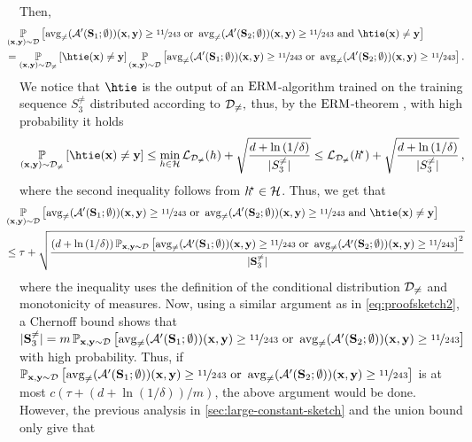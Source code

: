 Then,
\begin{align*}
& \hspace{-0.5 cm} \p_{(\rx,\ry)\sim \cD}\left[ \avg( \cA'(\rS_{1};\emptyset))(\rx,\ry)\geq \nicefrac{11}{243}\text{ or } \avg( \cA'(\rS_{2};\emptyset))(\rx,\ry)\geq \nicefrac{11}{243} \text{ and } \htie(\rx)\not=\ry\right]
    \\
& \hspace{-0.5 cm} = 
    \p_{(\rx,\ry)\sim \cD_{\not=}}\left[ \htie (\rx)\not=\ry\right]
    \p_{(\rx,\ry)\sim \cD}\left[ \avg( \cA'(\rS_{1};\emptyset))(\rx,\ry)\geq \nicefrac{11}{243}\text{ or } \avg( \cA'(\rS_{2};\emptyset))(\rx,\ry)\geq \nicefrac{11}{243}\right].
\end{align*}
We notice that $\htie$ is the output of an $ \mathrm{ERM} $-algorithm trained on the training sequence $ S_{3}^{\not=} $ distributed according to $ \mathcal{D}_{\not=},$ thus, by the $ \mathrm{ERM} $-theorem , with high probability it holds 
\begin{align}
    \p_{(\rx,\ry)\sim \cD_{\not=}}\left[ \htie(\rx)\not=\ry\right]\leq \min_{h\in \cH}\ls_{\cD_{\not=}}(h)+\sqrt{\frac{d+\ln{\left(1/\delta \right)}}{|S_{3}^{\not=}|}}\leq \ls_{\cD_{\not=}}(\hs)+\sqrt{\frac{d+\ln{\left(1/\delta \right)}}{|S_{3}^{\not=}|}} \,,\nonumber
\end{align}
where the second inequality follows from $h^{\negmedspace\star}\in\mathcal{H}$. Thus, we get that
\begin{align*}
&  \hspace{-0.5 cm} \p_{(\rx,\ry)\sim \cD}\left[ \avg( \cA'(\rS_{1};\emptyset))(\rx,\ry)\geq \nicefrac{11}{243}\text{ or } \avg( \cA'(\rS_{2};\emptyset))(\rx,\ry)\geq \nicefrac{11}{243}\text{ and } \htie(\rx)\not=\ry\right] \\
& \hspace{-0.5 cm} \leq \tau+\sqrt{\frac{\left(d+\ln{\left(1/\delta \right)}\right)\p_{\rx,\ry\sim \cD}\left[\avg( \cA'(\rS_{1};\emptyset))(\rx,\ry)\geq \nicefrac{11}{243}\text{ or } \avg( \cA'(\rS_{2};\emptyset))(\rx,\ry)\geq \nicefrac{11}{243}\right]^{2}}{|\rS_{3}^{\not=}|}}
\end{align*}
where the inequality uses the definition of the conditional distribution $ \mathcal{D}_{\not=} $ and monotonicity of measures. Now, using a similar argument as in \cref{eq:proofsketch2}, a Chernoff bound shows that $ |\mathbf{S}_{3}^{\not=}| =m\operatorname*{\mathbb{P}}_{\mathbf{x},\mathbf{y}\sim \mathcal{D}}\left[\operatorname{\mathrm{avg}_{\not=}}( \mathcal{A}'(\mathbf{S}_{1};\emptyset))(\mathbf{x},\mathbf{y})\geq \nicefrac{11}{243}\text{ or } \operatorname{\mathrm{avg}_{\not=}}( \mathcal{A}'(\mathbf{S}_{2};\emptyset))(\mathbf{x},\mathbf{y})\geq \nicefrac{11}{243}\right]$ with high probability. Thus, if $ \operatorname*{\mathbb{P}}_{\mathbf{x},\mathbf{y}\sim \mathcal{D}}\left[\operatorname{\mathrm{avg}_{\not=}}( \mathcal{A}'(\mathbf{S}_{1};\emptyset))(\mathbf{x},\mathbf{y})\geq \nicefrac{11}{243}\text{ or }\operatorname{\mathrm{avg}_{\not=}}( \mathcal{A}'(\mathbf{S}_{2};\emptyset))(\mathbf{x},\mathbf{y})\geq \nicefrac{11}{243}\right] $ is at most $ c(\tau +(d+\ln{\left(1/\delta \right)})/m)$, the above argument would be done. However, the previous analysis in \cref{sec:large-constant-sketch} and the union bound only give that

